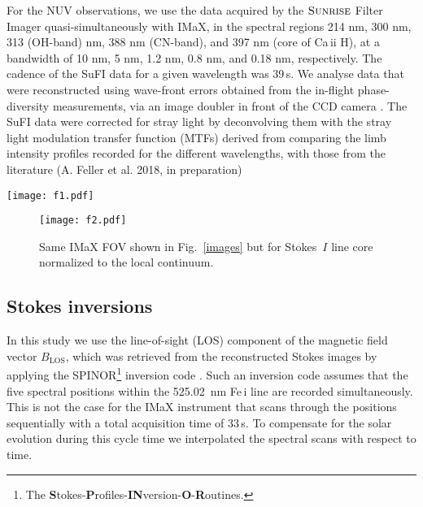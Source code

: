 \documentclass[goettingen, gauss, print]{thesis}
\begin{document}
For the NUV observations, we use the data acquired by the $\textsc{Sunrise}$ Filter Imager \citep[SuFI;][]{gandorfer_filter_2011} quasi-simultaneously with IMaX, in the spectral regions 214 nm, 300 nm, 313 (OH-band) nm, 388 nm (CN-band), and 397 nm (core of Ca\,{\sc ii} H), at a bandwidth of 10 nm, 5 nm, 1.2 nm, 0.8 nm, and 0.18 nm, respectively. The cadence of the SuFI data for a given wavelength was 39\,s. We analyse data that were reconstructed using wave-front errors obtained from the in-flight phase-diversity measurements, via an image doubler in front of the CCD camera \citep[level 3 data, see][]{hirzberger_quiet-sun_2010, hirzberger_performance_2011}. The SuFI data were corrected for stray light by deconvolving them with the stray light modulation transfer function (MTFs) derived from comparing the limb intensity profiles recorded for the different wavelengths, with those from the literature (A. Feller et al. 2018, in preparation)%

\begin{landscape}
\begin{figure*}
\centering
\texttt{[image: f1.pdf]}
\caption{Example of aligned SuFI and IMaX contrast images, a) SuFI at 214 nm, b) SuFI at 300 nm,  c) SuFI at 313 nm (OH-band), d) SuFI at 388 nm (CN-band), e) SuFI  Ca\,{\sc ii} H line core at 397.0 nm, f) IMaX line core, g) full FOV of IMaX Stokes~$I$ continuum at 5250.4\, \AA{}. The red box overlaid on the IMaX FOV is the common FOV ($13^{\prime\prime}\times38^{\prime\prime}$), to which the other images in this figure are trimmed. The gray scale is set to cover two times the rms range of each image.
}
\label{images}
\end{figure*}
\end{landscape}

\begin{figure}
\centering
\texttt{[image: f2.pdf]}                                                                                                                                       
\caption{Same IMaX FOV shown in Fig.~\ref{images} but for Stokes~$I$ line core normalized to the local continuum.}
\label{LC_qs}
\end{figure}

\subsection{Stokes inversions}
In this study we use the line-of-sight (LOS) component of the magnetic field vector $B_{\mathrm{LOS}}$, which was retrieved from the
reconstructed Stokes images by applying the SPINOR\footnote{The {\bf S}tokes-{\bf P}rofiles-{\bf IN}version-{\bf O}-{\bf R}outines.}
inversion code \citep{solanki_photospheric_1987,frutiger_properties_2000}. Such an inversion code assumes that the five spectral positions within the
525.02~nm Fe\,{\sc i} line are recorded simultaneously. This is not the case for the IMaX instrument that scans through the positions sequentially
with a total acquisition time of 33\,s. To compensate for the solar evolution during this cycle time we interpolated the spectral scans with
respect to time.
\end{document}
